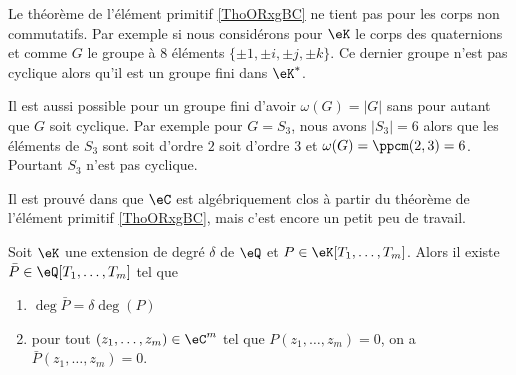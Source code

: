 \begin{example}
    Le théorème de l'élément primitif \ref{ThoORxgBC} ne tient pas pour les corps non commutatifs. Par exemple si nous considérons pour \( \eK\) le corps des quaternions et comme \( G\) le groupe à \( 8\) éléments \( \{ \pm 1,\pm i,\pm j,\pm k \}\). Ce dernier groupe n'est pas cyclique alors qu'il est un groupe fini dans \( \eK^*\).
\end{example}

\begin{example}
    Il est aussi possible pour un groupe fini d'avoir \( \omega(G)=| G |\) sans pour autant que \( G\) soit cyclique. Par exemple pour \( G=S_3\), nous avons \( | S_3 |=6\) alors que les éléments de \( S_3\) sont soit d'ordre \( 2\) soit d'ordre \( 3\) et \( \omega(G)=\ppcm(2,3)=6\). Pourtant \( S_3\) n'est pas cyclique.
\end{example}


\begin{remark}
    Il est prouvé dans \cite{rqrNyg} que \( \eC\) est algébriquement clos à partir du théorème de l'élément primitif \ref{ThoORxgBC}, mais c'est encore un petit peu de travail.
\end{remark}

\begin{lemma}    \label{LemSoXCQH}
    Soit \( \eK\) une extension de degré \( \delta\) de \( \eQ\) et \( P\in \eK[T_1,\ldots, T_m]\). Alors il existe \( \bar P\in \eQ[T_1,\ldots, T_m]\) tel que
    \begin{enumerate}
        \item
            $\deg\bar P=\delta\deg(P)$
        \item
            pour tout \( (z_1,\ldots, z_m)\in \eC^m\) tel que \( P(z_1,\ldots, z_m)=0\), on a \( \bar P(z_1,\ldots, z_m)=0\).
    \end{enumerate}
\end{lemma}

